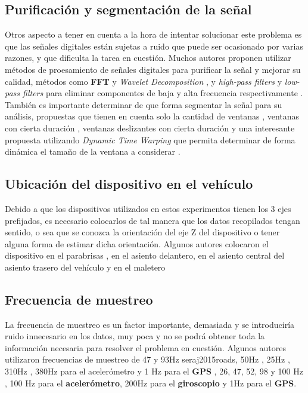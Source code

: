 	\subsection{Purificación y segmentación de la señal}
		Otros aspecto a tener en cuenta a la hora de intentar solucionar este problema es que las señales digitales están sujetas a ruido que puede ser
		ocasionado por varias razones, y que dificulta la tarea en cuestión. Muchos autores proponen utilizar métodos de proesamiento de señales digitales
		para purificar la señal y mejorar su calidad, métodos como \textbf{FFT} y \emph{Wavelet Decomposition} , y \emph{high-pass
		filters} y \emph{low-pass filters} para eliminar componentes de baja y alta frecuencia respectivamente . También es importante determinar de que forma segmentar la señal para su análisis, propuestas que tienen en cuenta solo la 
		cantidad de ventanas , ventanas con cierta duración , ventanas deslizantes
		con cierta duración  y una interesante propuesta utilizando \emph{Dynamic Time Warping} que permita determinar 
		de forma dinámica el tamaño de la ventana a considerar .

	\subsection{Ubicación del dispositivo en el vehículo}
		Debido a que los dispositivos utilizados en estos experimentos tienen los 3 ejes prefijados, es necesario colocarlos de tal manera que los
		datos recopilados tengan sentido, o sea que se conozca la orientación del eje Z del dispositivo o tener alguna forma de estimar dicha orientación.
		Algunos autores colocaron el dispositivo en el parabrisas , en el asiento delantero, en el asiento
		central del asiento trasero del vehículo y en el maletero 
		
	\subsection{Frecuencia de muestreo}
		La frecuencia de muestreo es un factor importante, demasiada y se introduciría ruido innecesario en los datos, muy poca y no se podrá obtener
		toda la información necesaria para resolver el problema en cuestión. Algunos autores utilizaron frecuencias de muestreo de 47 y 93Hz \brackcite
		{seraj2015roads}, 50Hz , 25Hz , 310Hz , 380Hz para el 
		acelerómetro y 1 Hz para el \textbf{GPS} , 26, 47, 52, 98 y 100 Hz , 100 Hz para el 
		\textbf{acelerómetro}, 200Hz para el \textbf{giroscopio} y 1Hz para el \textbf{GPS}.

